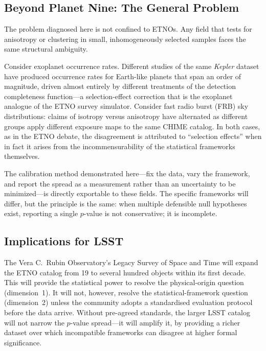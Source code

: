 \documentclass[12pt,a4paper]{article}
\begin{document}
\subsection{Beyond Planet Nine: The General Problem}

The problem diagnosed here is not confined to ETNOs. Any field that tests for anisotropy or clustering in small, inhomogeneously selected samples faces the same structural ambiguity.

Consider exoplanet occurrence rates. Different studies of the same \textit{Kepler} dataset have produced occurrence rates for Earth-like planets that span an order of magnitude, driven almost entirely by different treatments of the detection completeness function---a selection-effect correction that is the exoplanet analogue of the ETNO survey simulator. Consider fast radio burst (FRB) sky distributions: claims of isotropy versus anisotropy have alternated as different groups apply different exposure maps to the same CHIME catalog. In both cases, as in the ETNO debate, the disagreement is attributed to ``selection effects'' when in fact it arises from the incommensurability of the statistical frameworks themselves.

The calibration method demonstrated here---fix the data, vary the framework, and report the spread as a measurement rather than an uncertainty to be minimized---is directly exportable to these fields. The specific frameworks will differ, but the principle is the same: when multiple defensible null hypotheses exist, reporting a single $p$-value is not conservative; it is incomplete.

\subsection{Implications for LSST}

The Vera C.\ Rubin Observatory's Legacy Survey of Space and Time will expand the ETNO catalog from 19 to several hundred objects within its first decade. This will provide the statistical power to resolve the physical-origin question (dimension~1). It will not, however, resolve the statistical-framework question (dimension~2) unless the community adopts a standardised evaluation protocol before the data arrive. Without pre-agreed standards, the larger LSST catalog will not narrow the $p$-value spread---it will amplify it, by providing a richer dataset over which incompatible frameworks can disagree at higher formal significance.
\end{document}
